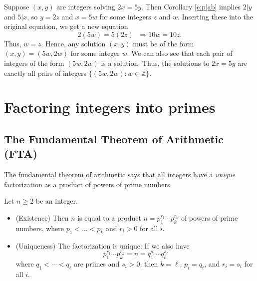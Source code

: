 \documentclass[11pt,dvipsnames]{book}
\numberwithin{equation}{section} %
\numberwithin{figure}{section} %
\numberwithin{table}{section} %
\begin{document}
 Suppose $(x,y)$ are integers solving $2x=5y$. Then Corollary \ref{c:p|ab} implies $2|y$ and $5|x$, so $y=2z$ and $x=5w$ for some integers $z$ and $w$. Inserting these into the original equation, we get a new equation 
 \[
 2(5w)=5(2z) \;\; \Rightarrow 10w=10z.
 \]
 Thus, $w=z$. Hence, any solution $(x,y)$ must be of the form $(x,y)=(5w,2w)$ for some integer $w$. We can also see that each pair of integers of the form $(5w,2w)$ is a solution. Thus, the solutions to $2x=5y$ are exactly all pairs of integers $\{(5w,2w):w\in\mathbb{Z}\}$. 
 



\section{Factoring integers into primes}

\subsection{The Fundamental Theorem of Arithmetic (FTA)}



The fundamental theorem of arithmetic says that all integers have a \emph{unique} factorization as a product of powers of prime numbers. 

\begin{theorem} \label{t:FTA} Let $n\geq 2$ be an integer.
\begin{itemize}
\item (Existence) Then $n$ is equal to a product $n=p_1^{r_{1}}\cdots p_k^{r_{k}}$ of powers of prime numbers, where $p_1< \ldots < p_k$ and $r_{i}>0$ for all $i$.
\item (Uniqueness) The factorization is unique: If we also have
$$ p_1^{r_{1}}\cdots p_k^{r_{k}} = n = q_1^{s_1}\cdots q_\ell^{s_{\ell}}$$
where  $q_{1}<\cdots < q_{\ell}$ are primes and $s_{i}> 0$, then $k=\ell$, $p_i=q_i$, and $r_{i}=s_{i}$ for all $i$.
\end{itemize}
\end{theorem}
\end{document}
